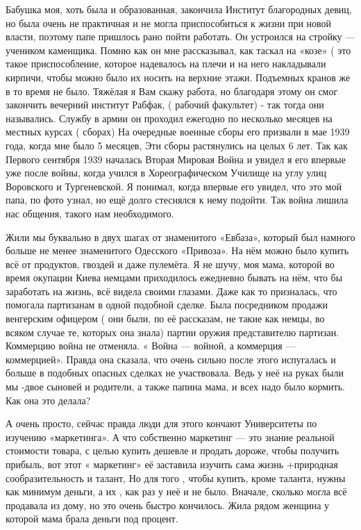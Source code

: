 Бабушка моя, хоть была и образованная, закончила
Институт благородных девиц, но была очень не практичная  и не могла
приспособиться к жизни при новой власти, поэтому папе пришлось рано пойти
работать. Он устроился на стройку — учеником каменщика. Помню как он мне
рассказывал, как таскал на «козе» ( это такое приспособление, которое
надевалось на плечи и на него накладывали кирпичи, чтобы можно было их носить
на верхние этажи. Подъемных кранов же в то время не было. Тяжёлая я Вам скажу
работа, но благодаря этому он смог закончить вечерний институт  Рабфак, (
рабочий факультет) - так  тогда они назывались. Службу в армии он проходил
ежегодно по несколько месяцев  на  местных  курсах ( сборах)  На очередные
военные сборы его призвали  в мае 1939 года, когда мне было 5 месяцев, Эти
сборы растянулись на целых 6 лет. Так как Первого сентября 1939 началась Вторая
Мировая Война и увидел я его впервые уже после войны, когда учился в
Хореографическом Училище на углу улиц Воровского и Тургеневской.  Я понимал,
когда впервые его увидел, что это мой папа, по фото  узнал, но  ещё долго
стеснялся  к нему подойти. Так война лишила нас общения, такого  нам
необходимого.

Жили мы буквально в двух шагах от знаменитого «Евбаза», который был намного
больше не менее знаменитого Одесского «Привоза». На нём можно было купить всё
от продуктов, гвоздей и даже пулемёта. Я не шучу, моя мама, которой  во время
окупации Киева немцами приходилось ежедневно бывать на нём, что бы заработать
на жизнь, всё видела  своими глазами. Даже как то призналась, что помогала
партизанам  в одной подобной сделке. Была посредником продажи  венгерским
офицером ( они были, по её рассказам, не такие как немцы, во всяком случае те,
которых она знала)  партии оружия представителю партизан. Коммерцию война не
отменяла. « Война — войной, а коммерция — коммерцией». Правда она сказала, что
очень сильно после этого испугалась и больше в подобных опасных сделках не
участвовала. Ведь у неё на руках были мы -двое сыновей и родители, а также
папина мама, и всех  надо было кормить.    Как она это делала?

А очень просто, сейчас правда люди для этого кончают Университеты по изучению
«маркетинга». А что собственно маркетинг — это знание реальной стоимости
товара, с целью купить дешевле и продать дороже, чтобы получить прибыль, вот
этот « маркетинг» её заставила изучить сама  жизнь +природная сообразительность
и талант, Но для того , чтобы купить, кроме таланта, нужны как минимум деньги,
а их , как раз у неё и не было. Вначале, сколько могла всё продавала из дому,
но это очень быстро кончилось.  Жила рядом женщина у которой мама  брала деньги
под процент. 

